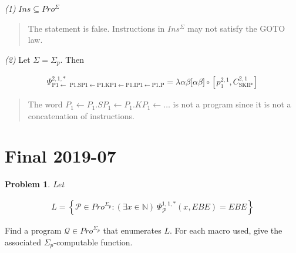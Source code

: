 \documentclass[a4paper, 12pt]{article}
\newtheorem{problem}{Problem}
\newtheorem{problem}{Problem}
\begin{document}
\pagebreak 

\textit{(1)} $Ins \subseteq Pro^{\Sigma}$


\small
\begin{quote}

    The statement is false. Instructions in $Ins^{\Sigma}$ may not satisfy the
    GOTO law.

\end{quote}
\normalsize


\textit{(2)} Let $\Sigma = \Sigma_p$. Then 

\begin{align*}
    \Psi _{\text{P1}\leftarrow \text{ P1.SP1}\leftarrow \text{P1.KP1}\leftarrow \text{P1.IP1}\leftarrow \text{P1.P} }^{2,1,\ast }=\lambda \alpha \beta \lbrack \alpha \beta ]\circ \left[ p_{1}^{2,1},C_{\mathrm{SKIP}}^{2,1}\right]
\end{align*}


\small
\begin{quote}

The word $P_1 \leftarrow  P_1.SP_1 \leftarrow P_1.KP_1 \leftarrow \ldots$ is not
a program since it is not a concatenation of instructions. 

\end{quote}
\normalsize

\pagebreak 

\section{Final 2019-07}

\begin{problem}
Let 

\begin{align*} L = \left\{ \mathcal{P} \in Pro^{\Sigma_p} : (\exists x \in
\mathbb{N}) ~ \Psi_{\mathcal{P}}^{1, 1, *}(x, EBE) = EBE \right\} \end{align*}
\end{problem}

Find a program $\mathcal{Q} \in Pro^{\Sigma_p}$ that enumerates $L$. For each
macro used, give the associated $\Sigma_p$-computable function.
\end{document}
